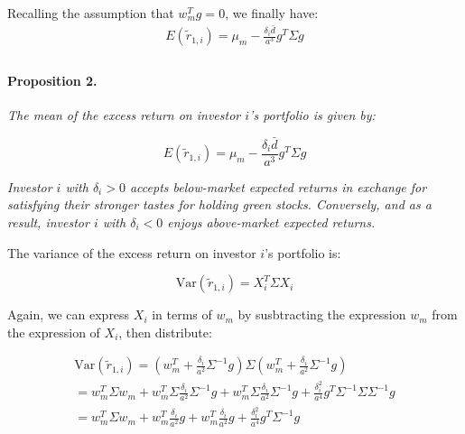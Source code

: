 Recalling the assumption that $w_m^T g = 0$, we finally have:
\begin{equation}
    \begin{aligned}
        E(\tilde{r}_{1,i}) = \mu_m  - \frac{\delta_i \bar{d}}{a^3} g^T \Sigma g\\
    \end{aligned}
\end{equation}


\paragraph{Proposition 2.} \textit{The mean of the excess return on 
investor $i$'s portfolio is given by:}

\begin{equation}
    E(\tilde{r}_{1,i}) = \mu_m - \frac{\delta_i \bar{d}}{a^3} g^T \Sigma g
\end{equation}

\textit{Investor $i$ with $\delta_i > 0$ accepts below-market expected returns 
in exchange for satisfying their stronger tastes for holding green stocks.
Conversely, and as a result, investor $i$ with $\delta_i < 0$ enjoys above-market expected returns.}


The variance of the excess return on investor $i$'s portfolio is:

\begin{equation}
    \text{Var}(\tilde{r}_{1,i}) = X_i^T \Sigma X_i
\end{equation}

Again, we can express $X_i$ in terms of $w_m$ by susbtracting the expression $w_m$
from the expression of $X_i$, then distribute:

\begin{equation}
    \begin{aligned}
        \text{Var}(\tilde{r}_{1,i}) = (w^T_m + \frac{\delta_i}{a^2} \Sigma^{-1}g) \Sigma (w^T_m + \frac{\delta_i}{a^2} \Sigma^{-1}g) \\
        = w^T_m \Sigma w_m + w^T_m \Sigma \frac{\delta_i}{a^2} \Sigma^{-1}g + w^T_m \Sigma \frac{\delta_i}{a^2} \Sigma^{-1}g + \frac{\delta_i^2}{a^4} g^T \Sigma^{-1} \Sigma \Sigma^{-1} g \\
        = w^T_m \Sigma w_m + w^T_m \frac{\delta_i}{a^2} g + w^T_m \frac{\delta_i}{a^2} g + \frac{\delta_i^2}{a^4} g^T \Sigma^{-1} g \\
    \end{aligned}
\end{equation}

